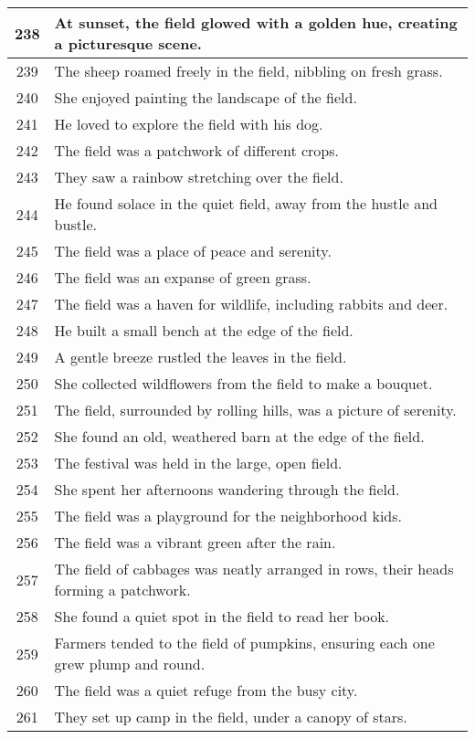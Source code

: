 \begin{longtable}{|c|p{12cm}|}
238 & At sunset, the field glowed with a golden hue, creating a picturesque scene. \\ \hline
239 & The sheep roamed freely in the field, nibbling on fresh grass. \\ \hline
240 & She enjoyed painting the landscape of the field. \\ \hline
241 & He loved to explore the field with his dog. \\ \hline
242 & The field was a patchwork of different crops. \\ \hline
243 & They saw a rainbow stretching over the field. \\ \hline
244 & He found solace in the quiet field, away from the hustle and bustle. \\ \hline
245 & The field was a place of peace and serenity. \\ \hline
246 & The field was an expanse of green grass. \\ \hline
247 & The field was a haven for wildlife, including rabbits and deer. \\ \hline
248 & He built a small bench at the edge of the field. \\ \hline
249 & A gentle breeze rustled the leaves in the field. \\ \hline
250 & She collected wildflowers from the field to make a bouquet. \\ \hline
251 & The field, surrounded by rolling hills, was a picture of serenity. \\ \hline
252 & She found an old, weathered barn at the edge of the field. \\ \hline
253 & The festival was held in the large, open field. \\ \hline
254 & She spent her afternoons wandering through the field. \\ \hline
255 & The field was a playground for the neighborhood kids. \\ \hline
256 & The field was a vibrant green after the rain. \\ \hline
257 & The field of cabbages was neatly arranged in rows, their heads forming a patchwork. \\ \hline
258 & She found a quiet spot in the field to read her book. \\ \hline
259 & Farmers tended to the field of pumpkins, ensuring each one grew plump and round. \\ \hline
260 & The field was a quiet refuge from the busy city. \\ \hline
261 & They set up camp in the field, under a canopy of stars. \\ \hline

\end{longtable}
